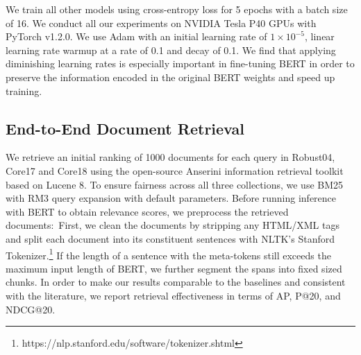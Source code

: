 We train all other models using cross-entropy loss for 5 epochs with a batch size of 16.
We conduct all our experiments on NVIDIA Tesla P40 GPUs with PyTorch v1.2.0.
We use Adam \cite{kingma2014adam} with an initial learning rate of $ 1 \times 10^{-5}$, linear learning rate warmup at a rate of 0.1 and decay of 0.1.
We find that applying diminishing learning rates is especially important in fine-tuning BERT in order to preserve the information encoded in the original BERT weights and speed up training.

\subsection{End-to-End Document Retrieval}

We retrieve an initial ranking of 1000 documents for each query in Robust04, Core17 and Core18 using the open-source Anserini information retrieval toolkit based on Lucene 8.
To ensure fairness across all three collections, we use BM25 with RM3 query expansion with default parameters.
Before running inference with BERT to obtain relevance scores, we preprocess the retrieved documents:\
First, we clean the documents by stripping any HTML/XML tags and split each document into its constituent sentences with NLTK's Stanford Tokenizer.\footnote{https://nlp.stanford.edu/software/tokenizer.shtml}
If the length of a sentence with the meta-tokens still exceeds the maximum input length of BERT, we further segment the spans into fixed sized chunks.
In order to make our results comparable to the baselines and consistent with the literature, we report retrieval effectiveness in terms of AP, P@20, and NDCG@20.

